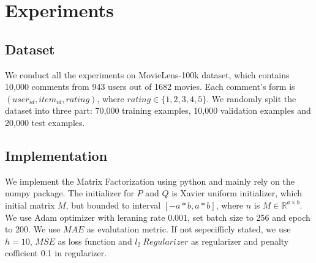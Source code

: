\documentclass[journal, a4paper]{IEEEtran}
\begin{document}
\section{Experiments}
\subsection{Dataset}
We conduct all the experiments on MovieLens-100k dataset, which contains 10,000 comments from 943 users out of 1682 movies. Each comment's form is $(user_{id}, item_{id}, rating)$, where $ rating \in \{1, 2, 3, 4, 5\}$. We randomly split the dataset into three part: 70,000 training examples, 10,000 validation examples and 20,000 test examples. \par

\subsection{Implementation}
We implement the Matrix Factorization using python and mainly rely on the numpy package. The initializer for $P$ and $Q$ is Xavier uniform initializer, which initial matrix $M$, but bounded to interval $[-a*b, a*b]$, where $n$ is $M \in \mathbb{R}^{a\times b}$. We use Adam optimizer with leraning rate 0.001, set batch size to 256 and epoch to 200. We use $MAE$ as evalutation metric. If not sepecifficly stated, we use $h = 10$, $MSE$ as loss function and $l_2~Regularizer$ as regularizer and penalty cofficient 0.1 in regularizer.  
\end{document}
